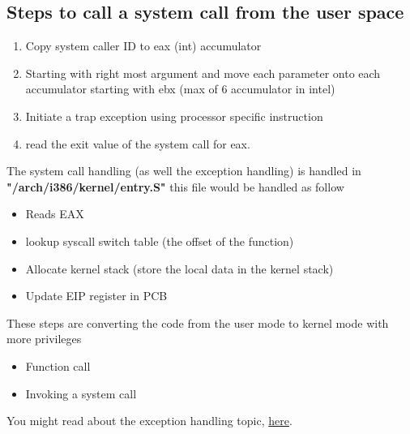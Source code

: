 \documentclass{article}
\begin{document}
\subsection{Steps to call a system call from the user space}
\begin{enumerate}
    \item Copy system caller ID to eax (int) accumulator
    \item Starting with right most argument and move each parameter onto each accumulator starting with ebx (max of 6 accumulator in intel)
    \item Initiate a trap exception using processor specific instruction
    \item read the exit value of the system call for eax.
\end{enumerate}

The system call handling (as well the exception handling) is handled in \textbf{"/arch/i386/kernel/entry.S"}
this file would be handled as follow
\begin{itemize}
    \item Reads EAX
    \item lookup syscall switch table (the offset of the function)
    \item Allocate kernel stack (store the local data in the kernel stack)
    \item Update EIP register in PCB
\end{itemize}

These steps are converting the code from the user mode to kernel mode with more privileges



\begin{mybox}[title={Difference between a normal function call and a syscall}]
     \begin{itemize}
         \item Function call
         

         \item Invoking a system call
         

     \end{itemize}
\end{mybox}

You might read about the exception handling topic, \href{https://www.kernel.org/doc/html/latest/x86/exception-tables.html}{here}.
\end{document}
